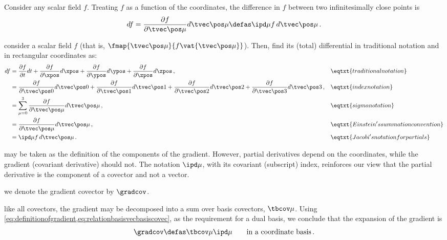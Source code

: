  Consider any scalar field $f$. Treating $f$ as a function of the coordinates, the difference in $f$ between two infinitesimally close points is
%
\begin{equation}\label{eq:definitionofgradient}
  df = \dfrac{\partial f}{\partial\tvec\pos\mu}d\tvec\pos\mu
     \defas\ipd\mu f\,d\tvec\pos\mu\,.
\end{equation}

 consider a scalar field $f$ (that is, $\fmap{\tvec\pos\mu}{f\vat{\tvec\pos\mu}}$). Then, find its (total) differential in traditional notation and in rectangular coordinates as:
%
\begin{align*}
  df &=   \dfrac{\partial f}{\partial t}    dt
        + \dfrac{\partial f}{\partial\xpos} d\xpos
        + \dfrac{\partial f}{\partial\ypos} d\ypos
        + \dfrac{\partial f}{\partial\zpos} d\zpos\,,        &&\eqtxt{traditional notation} \\
     &=   \dfrac{\partial f}{\partial\tvec\pos 0} d\tvec\pos 0
        + \dfrac{\partial f}{\partial\tvec\pos 1} d\tvec\pos 1
        + \dfrac{\partial f}{\partial\tvec\pos 2} d\tvec\pos 2
        + \dfrac{\partial f}{\partial\tvec\pos 3} d\tvec\pos 3 \,,                  &&\eqtxt{index notation} \\
     &= \sum_{\mu = 0}^{3}\dfrac{\partial f}{\partial\tvec\pos\mu} d\tvec\pos\mu\,, &&\eqtxt{sigma notation} \\
     &= \dfrac{\partial f}{\partial\tvec\pos\mu} d\tvec\pos\mu\,,  &&\eqtxt{Einstein's summation convention} \\
     &= \ipd\mu f\,d\tvec\pos\mu\,.       &&\eqtxt{Jacobi's notation for partials}
\end{align*}

 may be taken as the definition of the components of the gradient. However, partial derivatives depend on the coordinates, while the gradient (covariant derivative) should not. The notation $\ipd\mu$, with its covariant (subscript) index, reinforces our view that the partial derivative is the component of a covector and not a vector. 

 we denote the gradient covector by $\gradcov$.

 like all covectors, the gradient may be decomposed into a sum over basis covectors, $\tbcov\mu$. Using \cref{eq:definitionofgradient,eq:relationbasisvecbasiscovec}, as the requirement for a dual basis, we conclude that the expansion of the gradient is
%
\begin{equation}\label{eq:gradientexpansiononcoordinatebasis}
  \gradcov \defas \tbcov\mu\ipd\mu\qquad\text{in a coordinate basis}\,.
\end{equation}

